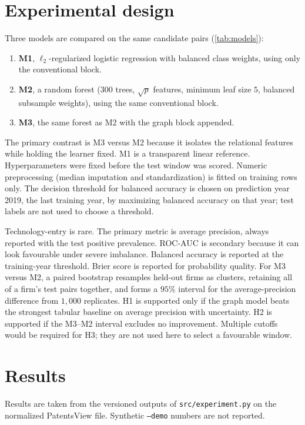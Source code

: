 \documentclass[preprint,12pt,3p]{elsarticle}
\begin{document}
\section{Experimental design}
\label{sec:design}
Three models are compared on the same candidate pairs (\cref{tab:models}):
\begin{enumerate}
\item \textbf{M1}, $\ell_2$-regularized logistic regression with balanced class weights, using only the conventional block.
\item \textbf{M2}, a random forest ($300$ trees, $\sqrt{p}$ features, minimum leaf size $5$, balanced subsample weights), using the same conventional block.
\item \textbf{M3}, the same forest as M2 with the graph block appended.
\end{enumerate}
The primary contrast is M3 versus M2 because it isolates the relational features while holding the learner fixed. M1 is a transparent linear reference. Hyperparameters were fixed before the test window was scored. Numeric preprocessing (median imputation and standardization) is fitted on training rows only. The decision threshold for balanced accuracy is chosen on prediction year 2019, the last training year, by maximizing balanced accuracy on that year; test labels are not used to choose a threshold.

Technology-entry is rare. The primary metric is average precision, always reported with the test positive prevalence. ROC-AUC is secondary because it can look favourable under severe imbalance. Balanced accuracy is reported at the training-year threshold. Brier score is reported for probability quality. For M3 versus M2, a paired bootstrap resamples held-out firms as clusters, retaining all of a firm's test pairs together, and forms a $95\%$ interval for the average-precision difference from $1{,}000$ replicates. H1 is supported only if the graph model beats the strongest tabular baseline on average precision with uncertainty. H2 is supported if the M3--M2 interval excludes no improvement. Multiple cutoffs would be required for H3; they are not used here to select a favourable window.

\section{Results}
\label{sec:results}
Results are taken from the versioned outputs of \texttt{src/experiment.py} on the normalized PatentsView file. Synthetic \texttt{--demo} numbers are not reported.
\end{document}

